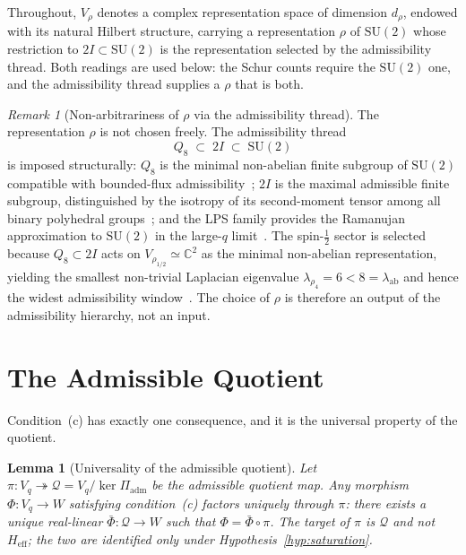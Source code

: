 \documentclass[11pt,a4paper]{article}
\newtheorem{lemma}[theorem]{Lemma}
\theoremstyle{remark}
\newtheorem{remark}[theorem]{Remark}
\begin{document}
  Throughout, $V_\rho$ denotes a complex representation space of dimension $d_\rho$, endowed with
  its natural Hilbert structure, carrying a representation $\rho$ of $\mathrm{SU}(2)$ whose
  restriction to $2I \subset \mathrm{SU}(2)$ is the representation selected by the admissibility
  thread.
  Both readings are used below: the Schur counts require the $\mathrm{SU}(2)$ one, and the
  admissibility thread supplies a $\rho$ that is both.

  \begin{remark}[Non-arbitrariness of $\rho$ via the admissibility thread]
    \label{rem:thread}
    The representation $\rho$ is not chosen freely.
    The admissibility thread
    \[
      Q_8 \;\subset\; 2I \;\subset\; \mathrm{SU}(2)
    \]
    is imposed structurally: $Q_8$ is the minimal non-abelian finite subgroup of $\mathrm{SU}(2)$
    compatible with bounded-flux admissibility~\cite{Beau2026a1}; $2I$ is the maximal admissible
    finite subgroup, distinguished by the isotropy of its second-moment tensor among all binary
    polyhedral groups~\cite{Beau2026a2}; and the LPS family provides the Ramanujan approximation
    to $\mathrm{SU}(2)$ in the large-$q$ limit~\cite{Beau2026a1}.
    The spin-$\tfrac{1}{2}$ sector is selected because $Q_8 \subset 2I$ acts on $V_{\rho_{1/2}}
    \simeq \mathbb{C}^2$ as the minimal non-abelian representation, yielding the smallest
    non-trivial Laplacian eigenvalue $\lambda_{\rho_4} = 6 < 8 = \lambda_{\mathrm{ab}}$ and hence
    the widest admissibility window~\cite{Beau2026a1,Beau2026a30}.
    The choice of $\rho$ is therefore an output of the admissibility hierarchy, not an input.
  \end{remark}

  \section{The Admissible Quotient}
  \label{sec:exclusion}

  Condition~(c) has exactly one consequence, and it is the universal property of the quotient.

  \begin{lemma}[Universality of the admissible quotient]
    \label{lem:quotient}
    Let $\pi \colon V_q \twoheadrightarrow \mathcal{Q} = V_q / \ker \Pi_{\mathrm{adm}}$ be the
    admissible quotient map.
    Any morphism $\Phi \colon V_q \to W$ satisfying condition~(c) factors uniquely through $\pi$:
    there exists a unique real-linear $\bar{\Phi} \colon \mathcal{Q} \to W$ such that
    $\Phi = \bar{\Phi} \circ \pi$.
    The target of $\pi$ is $\mathcal{Q}$ and not $H_{\mathrm{eff}}$; the two are identified only
    under Hypothesis~\ref{hyp:saturation}.
  \end{lemma}
\end{document}

